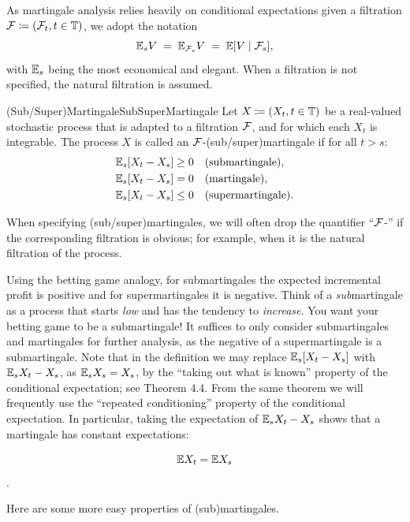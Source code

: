 As martingale analysis relies heavily on conditional expectations given a filtration $\mathcal{F} \coloneqq (\mathcal{F}_t, t \in \mathbb{T})$, we adopt the notation
\[
	\mathbb{E}_s V \;=\; \mathbb{E}_{\mathcal{F}_s} V \;=\; \mathbb{E}[V \mid \mathcal{F}_s],
\]
with $\mathbb{E}_s$ being the most economical and elegant. When a filtration is not specified, the natural filtration is assumed.

\begin{defn}{(Sub/Super)Martingale}{SubSuperMartingale}
	Let $X \coloneqq (X_t, t \in \mathbb{T})$ be a real-valued stochastic process that is adapted to a filtration $\mathcal{F}$, and for which each $X_t$ is integrable. The process $X$ is called an $\mathcal{F}$-(sub/super)martingale if for all $t > s$:
	\begin{equation}\label{eq:MartingaleDef}
		\begin{aligned}
			\mathbb{E}_s[X_t - X_s] & \ge 0 &  & \text{(submartingale)},   \\
			\mathbb{E}_s[X_t - X_s] & = 0   &  & \text{(martingale)},      \\
			\mathbb{E}_s[X_t - X_s] & \le 0 &  & \text{(supermartingale)}.
		\end{aligned}
	\end{equation}
\end{defn}

When specifying (sub/super)martingales, we will often drop the quantifier “\(\mathcal{F}\)-” if the corresponding filtration is obvious; for example, when it is the natural filtration of the process.

Using the betting game analogy, for submartingales the expected incremental profit is positive and for supermartingales it is negative. Think of a \textit{sub}martingale as a process that starts \textit{low} and has the tendency to \textit{increase}. You want your betting game to be a submartingale! It suffices to only consider submartingales and martingales for further analysis, as the negative of a supermartingale is a submartingale. Note that in the definition we may replace \(\mathbb{E}_s[X_t - X_s]\) with \(\mathbb{E}_s X_t - X_s\), as \(\mathbb{E}_s X_s = X_s\), by the “taking out what is known” property of the conditional expectation; see Theorem 4.4. From the same theorem we will frequently use the “repeated conditioning” property of the conditional expectation. In particular, taking the expectation of \(\mathbb{E}_s X_t - X_s\) shows that a martingale has constant expectations:

\[\mathbb{E} X_t = \mathbb{E} X_s\].

Here are some more easy properties of (sub)martingales.

